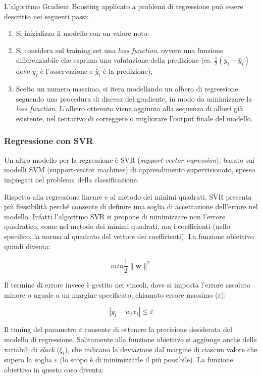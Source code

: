 L’algoritmo Gradient Boosting applicato a problemi di regressione può essere descritto nei seguenti passi:

\begin{enumerate}
  \item Si inizializza il modello con un valore noto;
  \item Si considera sul training set una \textit{loss function}, ovvero una funzione differenziabile che esprima una valutazione della predizione (es. $\frac{1}{2} (y_i - \hat{y}_{i})$ dove $y_i$ è l'osservazione e $\hat{y}_{i}$ è la predizione);
  \item Scelto un numero massimo, si itera modellando un albero di regressione seguendo una procedura di discesa del gradiente, in modo da minimizzare la \textit{loss function}. L'albero ottenuto viene aggiunto alla sequenza di alberi già esistente, nel tentativo di correggere o migliorare l'output finale del modello.
\end{enumerate}


\subsubsection{Regressione con SVR}\label{sssec:regressione-svr}
Un altro modello per la regressione è SVR (\textit{support-vector regression}), basato sui modelli SVM (support-vector machines) di apprendimento supervisionato, spesso impiegati nel problema della classificazione. \cite{svm}

Rispetto alla regressione lineare e al metodo dei minimi quadrati, SVR presenta più flessibilità perché consente di definire una soglia di accettazione dell'errore nel modello. Infatti l'algoritmo SVR si propone di minimizzare non l'errore quadratico, come nel metodo dei minimi quadrati, ma i coefficienti (nello specifico, la norma al quadrato del vettore dei coefficienti). La funzione obiettivo quindi diventa:

$$min \frac{1}{2}\|\mathbf{w}\|^{2}$$\smallskip

 Il termine di errore invece è gestito nei vincoli, dove si imposta l'errore assoluto minore o uguale a un margine specificato, chiamato errore massimo ($\varepsilon$):
 
 $$\left|y_{i}-w_{i} x_{i}\right| \leq \varepsilon$$\smallskip
 
 Il tuning del parametro $\varepsilon$ consente di ottenere la precisione desiderata del modello di regressione. Solitamente alla funzione obiettivo si aggiunge anche delle variabili di \textit{slack} ($\xi_{i}$), che indicano la deviazione dal margine di ciascun valore che supera la soglia $\varepsilon$ (lo scopo è di minimizzarle il più possibile). La funzione obiettivo in questo caso diventa:
 
